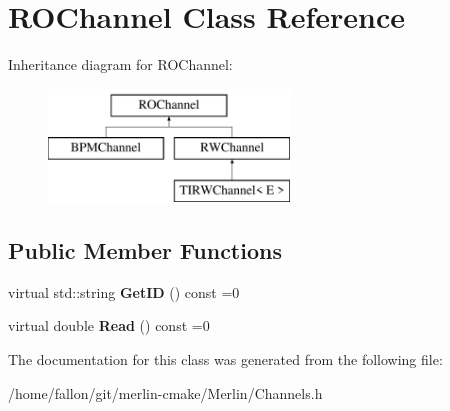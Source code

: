 \hypertarget{classROChannel}{}\section{R\+O\+Channel Class Reference}
\label{classROChannel}
Inheritance diagram for R\+O\+Channel\+:\begin{figure}[H]
\begin{center}
\leavevmode
\includegraphics[height=3.000000cm]{classROChannel}
\end{center}
\end{figure}
\subsection*{Public Member Functions}
\begin{DoxyCompactItemize}
\item 
\mbox{\label{classROChannel_a2847e182e183e1ce848b088e725c4bc1}} 
virtual std\+::string {\bfseries Get\+ID} () const =0
\item 
\mbox{\label{classROChannel_afdc5d5fbbc09167568e8ca576dfbdae0}} 
virtual double {\bfseries Read} () const =0
\end{DoxyCompactItemize}


The documentation for this class was generated from the following file\+:\begin{DoxyCompactItemize}
\item 
/home/fallon/git/merlin-\/cmake/\+Merlin/Channels.\+h\end{DoxyCompactItemize}
